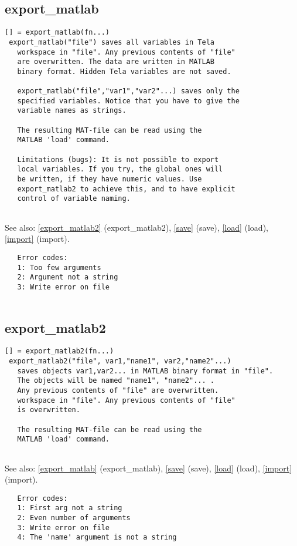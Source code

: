\documentclass[a4paper]{article}
\begin{document}
\subsection{export\_matlab\label{export_matlab}}

\begin{tscreen}
\begin{verbatim}
[] = export_matlab(fn...)
 export_matlab("file") saves all variables in Tela
   workspace in "file". Any previous contents of "file"
   are overwritten. The data are written in MATLAB
   binary format. Hidden Tela variables are not saved.

   export_matlab("file","var1","var2"...) saves only the
   specified variables. Notice that you have to give the
   variable names as strings.

   The resulting MAT-file can be read using the
   MATLAB 'load' command.
   
   Limitations (bugs): It is not possible to export
   local variables. If you try, the global ones will
   be written, if they have numeric values. Use
   export_matlab2 to achieve this, and to have explicit
   control of variable naming.
   
\end{verbatim}

See also: \ref{export_matlab2} {(export\_matlab2)}, \ref{save} {(save)}, \ref{load} {(load)}, \ref{import} {(import)}.
\begin{verbatim}
   Error codes:
   1: Too few arguments
   2: Argument not a string
   3: Write error on file
   
\end{verbatim}
\end{tscreen}



\subsection{export\_matlab2\label{export_matlab2}}

\begin{tscreen}
\begin{verbatim}
[] = export_matlab2(fn...)
 export_matlab2("file", var1,"name1", var2,"name2"...)
   saves objects var1,var2... in MATLAB binary format in "file".
   The objects will be named "name1", "name2"... .
   Any previous contents of "file" are overwritten.
   workspace in "file". Any previous contents of "file"
   is overwritten.

   The resulting MAT-file can be read using the
   MATLAB 'load' command.
   
\end{verbatim}

See also: \ref{export_matlab} {(export\_matlab)}, \ref{save} {(save)}, \ref{load} {(load)}, \ref{import} {(import)}.
\begin{verbatim}
   Error codes:
   1: First arg not a string
   2: Even number of arguments
   3: Write error on file
   4: The 'name' argument is not a string
   
\end{verbatim}
\end{tscreen}
\end{document}
